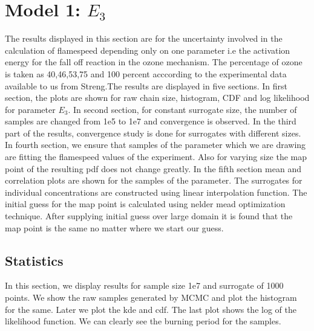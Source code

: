 \section{Model 1: $E_3$}

The results displayed in this section are for the uncertainty involved in the calculation of flamespeed depending only on one parameter i.e the activation energy for the fall off reaction in the ozone mechanism. The percentage of ozone is taken as 40,46,53,75 and 100  percent acccording to the experimental data available to us from Streng\cite{Streng}.The results are displayed in five sections. In first section, the plots are shown for raw chain size, histogram, CDF and log likelihood for parameter $E_3$. In second section, for constant surrogate size, the number of samples are changed from 1e5 to 1e7 and convergence is observed. In the third part of the results, convergence study is done for surrogates with different sizes. In fourth section, we ensure that samples of the parameter which we are drawing are fitting the flamespeed values of the experiment. Also for varying size the map point of the resulting pdf does not change greatly. In the fifth section mean and correlation plots are shown for the samples of the parameter. The surrogates for individual concentrations are constructed using linear interpolation function. The initial guess for the map point is calculated using nelder mead optimization technique. After supplying initial guess over large domain it is found that the map point is the same no matter where we start our guess. 
\bigskip

\subsection{ Statistics }

\noindent In this section, we display results for sample size 1e7 and surrogate of 1000 points. We show the raw samples generated by MCMC and plot the histogram for the same. Later we plot the kde and cdf. The last plot shows the log of the likelihood function. We can clearly see the burning period for the samples. 

